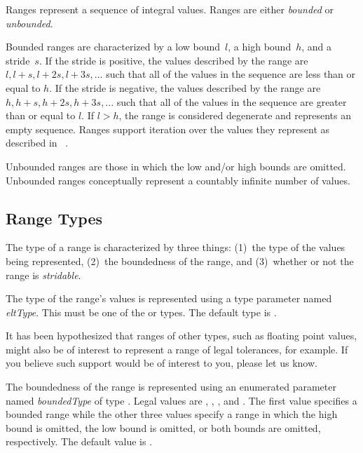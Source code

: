 \label{Ranges}

Ranges represent a sequence of integral values.  Ranges are
either \emph{bounded} or \emph{unbounded}.

Bounded ranges are characterized by a low bound~$l$, a high bound~$h$,
and a stride~$s$.  If the stride is positive, the values described by
the range are $l, l+s, l+2s, l+3s, ...$ such that all of the values in
the sequence are less than or equal to $h$.  If the stride is negative,
the values described by the range are $h, h+s, h+2s, h+3s, ...$ such
that all of the values in the sequence are greater than or equal to
$l$.  If $l > h$, the range is considered degenerate and represents an
empty sequence. Ranges support iteration over the values they represent
as described in ~.

Unbounded ranges are those in which the low and/or high bounds are
omitted.  Unbounded ranges conceptually represent a countably infinite
number of values.

\subsection{Range Types}
\label{Range_Types}

The type of a range is characterized by three things:
(1)~the type of the values being represented, (2)~the boundedness of
the range, and (3)~whether or not the range is \emph{stridable}.

The type of the range's values is represented using a type parameter
named \emph{eltType}.  This must be one of the  or
 types.  The default type is .

\begin{openissue}
It has been hypothesized that ranges of other types, such as floating
point values, might also be of interest to represent a range of legal
tolerances, for example.  If you believe such support would be of
interest to you, please let us know.
\end{openissue}

The boundedness of the range is represented using an enumerated
parameter named \emph{boundedType} of type .
Legal values are , ,
, and .  The first value specifies
a bounded range while the other three values specify a range in which
the high bound is omitted, the low bound is omitted, or both bounds
are omitted, respectively.  The default value is .

